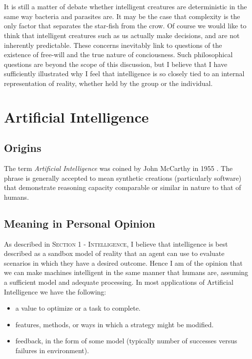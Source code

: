 \documentclass[10pt,a4paper]{article}
\begin{document}
				\\\\
				It is still a matter of debate whether intelligent creatures are deterministic in the same way bacteria and parasites are. It may be the case that complexity is the only factor that separates the star-fish from the crow. Of course we would like to think that intelligent creatures such as us actually make decisions, and are not inherently predictable. These concerns inevitably link to questions of the existence of free-will and the true nature of conciousness. Such philosophical questions are beyond the scope of this discussion, but I believe that I have sufficiently illustrated why I feel that intelligence is so closely tied to an internal representation of reality, whether held by the group or the individual.
				
		\pagebreak
		\section{Artificial Intelligence}
		 	\subsection{Origins}
				The term \textsl{Artificial Intelligence} was coined by John McCarthy in 1955 \cite{intel}. The phrase is generally accepted to mean synthetic creations (particularly software) that demonstrate reasoning capacity comparable or similar in nature to that of humans.
		
		
			\subsection{Meaning in Personal Opinion}
		
				As described in \textsc{Section 1 - Intelligence}, I believe that intelligence is best described as a sandbox model of reality that an agent can use to evaluate scenarios in which they have a desired outcome. Hence I am of the opinion that we can make machines intelligent in the same manner that humans are, assuming a sufficient model and adequate processing. In most applications of Artificial Intelligence we have the following: 
				
				\begin{itemize}
					\item a value to optimize or a task to complete.
					\item features, methods,  or ways in which a strategy might be modified.
					\item feedback, in the form of some model (typically number of successes versus failures in environment).
				\end{itemize}
				
\end{document}
